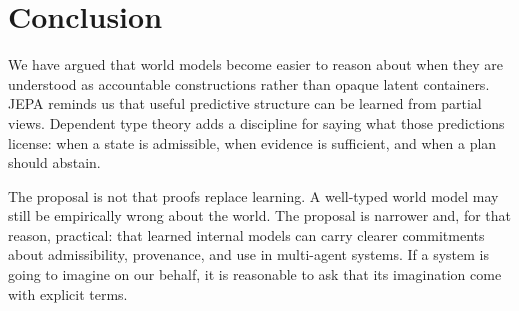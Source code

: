 \documentclass[12pt, a4paper]{article}
\begin{document}
\section{Conclusion}
\label{sec:conclusion}

We have argued that world models become easier to reason about when they are
understood as accountable constructions rather than opaque latent containers.
JEPA reminds us that useful predictive structure can be learned from partial
views. Dependent type theory adds a discipline for saying what those predictions
license: when a state is admissible, when evidence is sufficient, and when a
plan should abstain.

The proposal is not that proofs replace learning. A well-typed world model may
still be empirically wrong about the world. The proposal is narrower and, for
that reason, practical: that learned internal models can carry clearer
commitments about admissibility, provenance, and use in multi-agent systems. If
a system is going to imagine on our behalf, it is reasonable to ask that its
imagination come with explicit terms.



\end{document}
